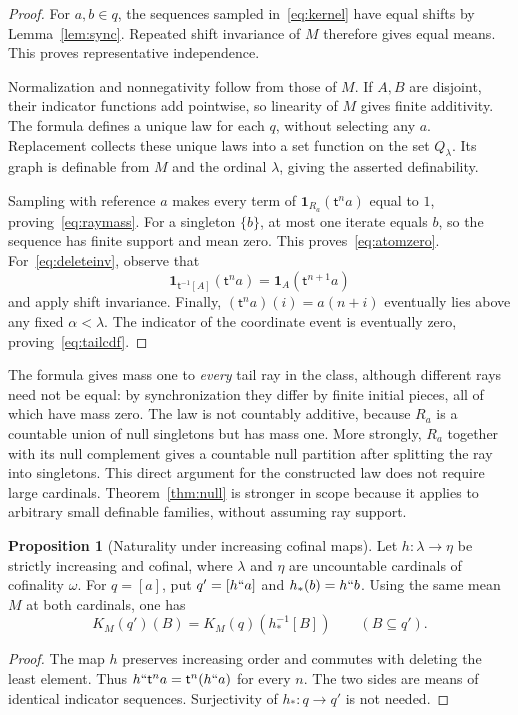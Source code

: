 \documentclass[11pt,letterpaper]{article}
\theoremstyle{definition}
\newtheorem{proposition}[definition]{Proposition}
\newcommand{\Qlam}{Q_\lambda}
\newcommand{\ind}{\mathbf 1}
\newcommand{\tail}{\mathsf t}
\begin{document}
\begin{proof}
For $a,b\in q$, the sequences sampled in~\eqref{eq:kernel} have equal shifts by Lemma~\ref{lem:sync}. Repeated shift invariance of $M$ therefore gives equal means. This proves representative independence.

Normalization and nonnegativity follow from those of $M$. If $A,B$ are disjoint, their indicator functions add pointwise, so linearity of $M$ gives finite additivity. The formula defines a unique law for each $q$, without selecting any $a$. Replacement collects these unique laws into a set function on the set $\Qlam$. Its graph is definable from $M$ and the ordinal $\lambda$, giving the asserted definability.

Sampling with reference $a$ makes every term of $\ind_{R_a}(\tail^n a)$ equal to $1$, proving~\eqref{eq:raymass}. For a singleton $\{b\}$, at most one iterate equals $b$, so the sequence has finite support and mean zero. This proves~\eqref{eq:atomzero}. For~\eqref{eq:deleteinv}, observe that
\[
 \ind_{\tail^{-1}[A]}(\tail^n a)=\ind_A(\tail^{n+1}a)
\]
and apply shift invariance. Finally, $(\tail^n a)(i)=a(n+i)$ eventually lies above any fixed $\alpha<\lambda$. The indicator of the coordinate event is eventually zero, proving~\eqref{eq:tailcdf}.
\end{proof}

The formula gives mass one to \emph{every} tail ray in the class, although different rays need not be equal: by synchronization they differ by finite initial pieces, all of which have mass zero. The law is not countably additive, because $R_a$ is a countable union of null singletons but has mass one. More strongly, $R_a$ together with its null complement gives a countable null partition after splitting the ray into singletons. This direct argument for the constructed law does not require large cardinals. Theorem~\ref{thm:null} is stronger in scope because it applies to arbitrary small definable families, without assuming ray support.

\begin{proposition}[Naturality under increasing cofinal maps]\label{prop:natural}
Let $h:\lambda\to\eta$ be strictly increasing and cofinal, where $\lambda$ and $\eta$ are uncountable cardinals of cofinality $\omega$. For $q=[a]$, put $q'=[h``a]$ and $h_*(b)=h``b$. Using the same mean $M$ at both cardinals, one has
\[
 K_M(q')(B)=K_M(q)(h_*^{-1}[B])\qquad(B\subseteq q').
\]
\end{proposition}

\begin{proof}
The map $h$ preserves increasing order and commutes with deleting the least element. Thus $h``\tail^n a=\tail^n(h``a)$ for every $n$. The two sides are means of identical indicator sequences. Surjectivity of $h_*:q\to q'$ is not needed.
\end{proof}
\end{document}
